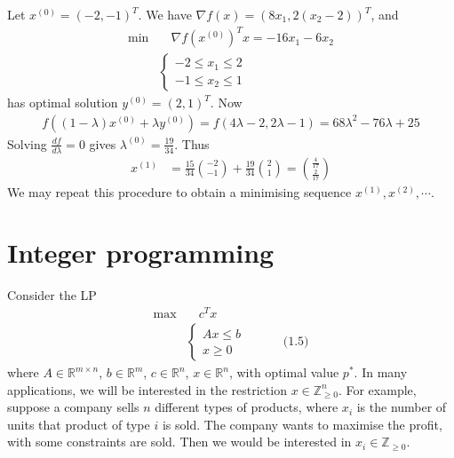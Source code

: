 Let $x^{(0)} = (-2, -1)^T$. We have $\nabla f(x) = \left( 8x_1, 2(x_2-2)\right)^T$, and 
\begin{align*}
    \min & \quad \nabla f(x^{(0)})^T x = -16x_1 - 6x_2 \\
    & \left\lbrace\begin{array}{l}
             -2\leqslant x_1\leqslant 2  \\
             -1\leqslant x_2\leqslant 1
    \end{array} \right.
\end{align*}
has optimal solution $y^{(0)} = (2, 1)^T$. Now 
\begin{align*}
    f((1-\lambda)x^{(0)} + \lambda y^{(0)}) = f(4\lambda-2, 2\lambda-1) = 68\lambda^2 - 76\lambda + 25
\end{align*}
Solving $\frac{df}{d\lambda} = 0$ gives $\lambda^{(0)} = \frac{19}{34}$. Thus 
\begin{align*}
    x^{(1)} &= \frac{15}{34}\binom{-2}{-1} + \frac{19}{34}\binom{2}{1} = \binom{\frac{4}{17}}{\frac{2}{17}}
\end{align*}
We may repeat this procedure to obtain a minimising sequence $x^{(1)}, x^{(2)}, \cdots$.

\section{Integer programming}
Consider the LP
\begin{align*}
    \max &\quad c^T x \\
    &\left\lbrace\begin{array}{c}
         Ax\leqslant b  \\
         x\geqslant 0
    \end{array} \right.\quad\quad\quad \text{(1.5)}
\end{align*}
where $A\in\mathbb{R}^{m\times n}$, $b\in\mathbb{R}^m$, $c\in\mathbb{R}^n$, $x\in\mathbb{R}^n$, with optimal value $p^*$. In many applications, we will be interested in the restriction $x\in\mathbb{Z}^n_{\geqslant 0}$. For example, suppose a company sells $n$ different types of products, where $x_i$ is the number of units that product of type $i$ is sold. The company wants to maximise the profit, with some constraints are sold. Then we would be interested in $x_i\in \mathbb{Z}_{\geqslant 0}$.

